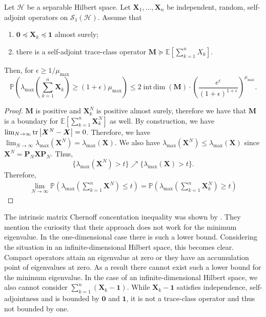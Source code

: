 \begin{corl}
    Let \( \mathcal{H} \) be a separable Hilbert space. Let \( \bm{X}_1, \dots, \bm{X}_n \) be independent, random, self-adjoint operators on \( \mathcal{S}_1(\mathcal{H}) \). Assume that
    \begin{enumerate}[1)]
      \item \( \bm{0} \preceq \bm{X}_k \preceq \bm{1} \) almost surely;
      \item there is a self-adjoint trace-class operator \( \bm{M} \succeq \mathbb{E}\left[\sum_{k=1}^{n}X_k\right]. \)
    \end{enumerate}
    Then, for \( \epsilon \geq 1/\mu_{\text{max}} \)
    \[\mathbb{P}\left(\lambda_{\text{max}} \left(\sum_{k=1}^{n}\bm{X}_k\right) \geq (1+\epsilon)\mu_{\text{max}}\right) \leq 2\operatorname{int\, dim}\left(\bm{M}\right) \cdot \left(\frac{e^{\epsilon}}{\left(1+\epsilon\right)^{1+\epsilon}}\right)^{\mu_{\text{max}}}.\]

\end{corl}

\begin{proof}
  \( \bm{M} \) is positive and \( \bm{X}^{N}_k \) is positive almost surely, therefore we have that \( \bm{M}  \) is a boundary for \( \mathbb{E}\left[\sum_{k=1}^{n}\bm{X}_k^{N}\right] \) as well. By construction, we have \( \lim_{N \to \infty} \operatorname{tr} \abs{ \bm{X}^{N}-\bm{X}}=0 \). Therefore, we have  \( \lim_{N \to \infty} \lambda_{\text{max}}\left(\bm{X}^{N}\right) = \lambda_{\text{max}}\left(\bm{X}\right) \). We also have \( \lambda_{\text{max}}(\bm{X}^{N}) \leq \lambda_{\text{max}}\left(\bm{X}\right) \) since \( \bm{X}^{N}=\bm{P}_N\bm{X}\bm{P}_N \). Thus,
  \[ \{\lambda_{\text{max}}(\bm{X}^{N}) > t \} \nearrow \{ \lambda_{\text{max}}\left(\bm{X}\right) >t\} .\]
  Therefore, 
  \begin{align*}
     \lim_{N \to \infty} \mathbb{P}\left(\lambda_{\text{max}} \left(\sum_{k=1}^{n}\bm{X}^{N}\right) \leq t \right) = \mathbb{P}\left(\lambda_{\text{max}} \left(\sum_{k=1}^{n} \bm{X}_k^{N}\right) \geq t\right)   \end{align*}
  
\end{proof}

The intrinsic matrix Chernoff concentation inequality was shown by \cite{tropp2015introduction}. They mention the curiosity that their approach does not work for the minimum eigenvalue. In the one-dimensional case there is such a lower bound. Considering the situation in an infinite-dimensional Hilbert space, this becomes clear. Compact operators attain an eigenvalue at zero or they have an accumulation point of eigenvalues at zero. As a result there cannot exist such a lower bound for the minimum eigenvalue. In the case of an infinite-dimensional Hilbert space, we also cannot consider \( \sum_{k=1}^{n}(\bm{X}_k-\bm{1}) \). While \( \bm{X}_k-\bm{1} \) satisfies independence, self-adjointness and is bounded by \( \bm{0} \) and \( \bm{1} \), it is not a trace-class operator and thus not bounded by one. 


